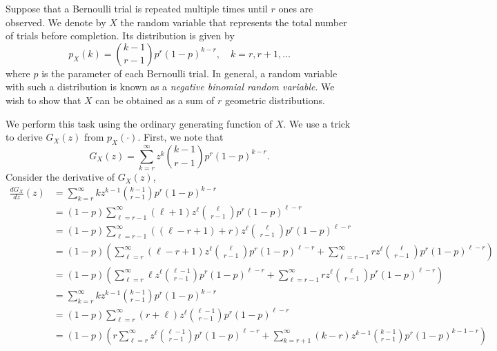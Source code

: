 \begin{example}
Suppose that a Bernoulli trial is repeated multiple times until $r$ ones are observed.
We denote by $X$ the random variable that represents the total number of trials before completion.
Its distribution is given by
\begin{equation*}
p_X (k) = \binom{k-1}{r-1} p^r (1-p)^{k-r}, \quad k = r, r+1, \ldots
\end{equation*}
where $p$ is the parameter of each Bernoulli trial.
In general, a random variable with such a distribution is known as a \emph{negative binomial random variable}. 
We wish to show that $X$ can be obtained as a sum of $r$ geometric distributions.

We perform this task using the ordinary generating function of $X$.
We use a trick to derive $G_X(z)$ from $p_X(\cdot)$.
First, we note that
\begin{equation*}
G_X (z) = \sum_{k = r}^{\infty} z^k \binom{k-1}{r-1} p^r (1-p)^{k-r} .
\end{equation*}
Consider the derivative of $G_X(z)$,
\begin{equation*}
\begin{split}
\frac{d G_X}{dz} (z)
&= \sum_{k=r}^{\infty} k z^{k-1} \binom{k-1}{r-1} p^r (1-p)^{k-r} \\
&= (1-p) \sum_{\ell=r-1}^{\infty} (\ell+1) z^{\ell} \binom{\ell}{r-1} p^r (1-p)^{\ell-r} \\
&= (1-p) \sum_{\ell=r-1}^{\infty} ( (\ell-r+1) + r ) z^{\ell} \binom{\ell}{r-1} p^r (1-p)^{\ell-r} \\
&= (1-p) \left( \sum_{\ell=r}^{\infty} (\ell-r+1) z^{\ell} \binom{\ell}{r-1} p^r (1-p)^{\ell-r}
+ \sum_{\ell=r-1}^{\infty} r z^{\ell} \binom{\ell}{r-1} p^r (1-p)^{\ell-r} \right) \\
&= (1-p) \left( \sum_{\ell=r}^{\infty} \ell z^{\ell} \binom{\ell-1}{r-1} p^r (1-p)^{\ell-r}
+ \sum_{\ell=r-1}^{\infty} r z^{\ell} \binom{\ell}{r-1} p^r (1-p)^{\ell-r} \right) \\
%
&= \sum_{k=r}^{\infty} k z^{k-1} \binom{k-1}{r-1} p^r (1-p)^{k-r} \\
&= (1-p) \sum_{\ell=r}^{\infty} (r + \ell) z^{\ell} \binom{\ell-1}{r-1} p^r (1-p)^{\ell-r} \\
&= (1-p) \left( r \sum_{\ell=r}^{\infty} z^\ell \binom{\ell-1}{r-1} p^r (1-p)^{\ell-r}
+ \sum_{k=r+1}^{\infty} (k-r) z^{k-1} \binom{k-1}{r-1} p^r (1-p)^{k-1-r} \right) \\
\end{split}

\end{equation*}
\end{example}
